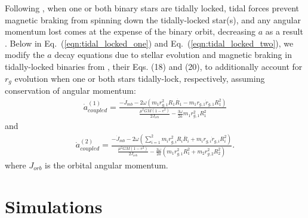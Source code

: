 \documentclass[twocolumn]{aastex61}
\begin{document}
Following \citet{Fleming2018}, when one or both binary stars are tidally locked, tidal forces prevent magnetic braking from spinning down the tidally-locked star(s), and any angular momentum lost comes at the expense of the binary orbit, decreasing $a$ as a result \citep{Verbunt1981}.  Below in Eq.~(\ref{eqn:tidal_locked_one}) and Eq.~(\ref{eqn:tidal_locked_two}), we modify the $a$ decay equations due to stellar evolution and magnetic braking in tidally-locked binaries from \citet{Fleming2018}, their Eqs. (18) and (20), to additionally account for $r_g$ evolution when one or both stars tidally-lock, respectively, assuming conservation of angular momentum:
\small
\begin{equation} \label{eqn:tidal_locked_one}
\begin{split}
\dot{a}_{coupled}^{(1)} = \frac{-\dot{J}_{mb} - 2 \omega \left( m_1 r_{g,1}^2 R_1 \dot{R_1} - m_1 r_{g,1} \dot{r}_{g,1} R_1^2 \right)}
{\frac{\mu^2 G M (1-e^2)}{2J_{orb}} - \frac{3 \omega}{2a} m_1 r_{g,1}^2 R_1^2}
\end{split}
\end{equation}
\normalsize
and
\small
\begin{equation} \label{eqn:tidal_locked_two}
\begin{split}
\dot{a}_{coupled}^{(2)} = \frac{-\dot{J}_{mb} - 2 \omega \left( \sum_{i=1}^{2} m_i r_{g,i}^2 R_i \dot{R_i} + m_i r_{g,i} \dot{r}_{g,i} R_i^2 \right)}
{\frac{\mu^2 G M (1-e^2)}{2J_{orb}} - \frac{3 \omega}{2a} \left( m_1 r_{g,1}^2 R_1^2 + m_2 r_{g,2}^2 R_2^2 \right)}.
\end{split}
\end{equation}
\normalsize
where $J_{orb}$ is the orbital angular momentum.

\section{Simulations} \label{sec:simulations}
\end{document}
